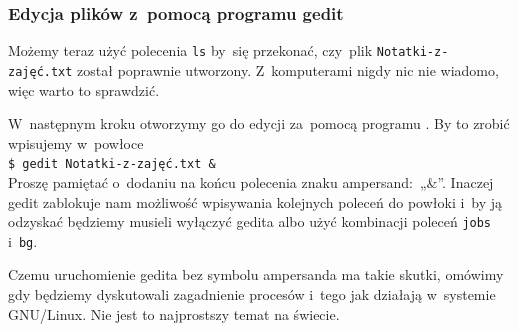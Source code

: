 \documentclass[10pt,t]{beamer}
\begin{document}
\begin{frame}
  \frametitle{Edycja plików z~pomocą programu gedit}


  Możemy teraz użyć polecenia \texttt{ls} by~się przekonać, czy~plik
  \texttt{Notatki-z-zajęć.txt} został poprawnie utworzony.
  Z~komputerami nigdy nic nie wiadomo, więc warto to sprawdzić.

  W~następnym kroku otworzymy go do edycji za~pomocą programu
  . By to zrobić
  wpisujemy w~powłoce \\
  \texttt{\$ gedit Notatki-z-zajęć.txt \&} \\
  Proszę pamiętać o~dodaniu na końcu polecenia znaku
  \alert{ampersand}:~„\&”. Inaczej gedit zablokuje nam możliwość wpisywania
  kolejnych poleceń do powłoki i~by ją odzyskać będziemy musieli
  wyłączyć gedita albo użyć kombinacji poleceń \texttt{jobs} i~\texttt{bg}.

  Czemu uruchomienie gedita bez symbolu ampersanda ma takie skutki, omówimy
  gdy będziemy dyskutowali zagadnienie procesów i~tego jak działają
  w~systemie GNU/Linux. Nie jest to najprostszy temat na świecie.

\end{frame}
\end{document}
